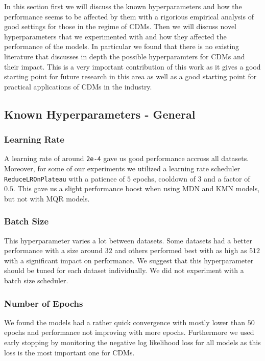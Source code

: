 In this section first we will discuss the known hyperparameters and how the performance seems to be affected by them with a rigorious empirical analysis of good settings for those in the regime of CDMs. Then we will discuss novel hyperparameters that we experimented with and how they affected the performance of the models. In particular we found that there is no existing literature that discusses in depth the possible hyperparamters for CDMs and their impact. This is a very important contribution of this work as it gives a good starting point for future research in this area as well as a good starting point for practical applications of CDMs in the industry.

\subsection{Known Hyperparameters - General}

\subsubsection{Learning Rate}

A learning rate of around \texttt{2e-4} gave us good performance accross all datasets. Moreover, for some of our experiments we utilized a learning rate scheduler \texttt{ReduceLROnPlateau} with a patience of $5$ epochs, cooldown of $3$ and a factor of $0.5$. This gave us a slight performance boost when using MDN and KMN models, but not with MQR models.

\subsubsection{Batch Size}

This hyperparameter varies a lot between datasets. Some datasets had a better performance with a size around $32$ and others performed best with as high as $512$ with a significant impact on performance. We suggest that this hyperparameter should be tuned for each dataset individually. We did not experiment with a batch size scheduler.

\subsubsection{Number of Epochs}

We found the models had a rather quick convergence with mostly lower than $50$ epochs and performance not improving with more epochs. Furthermore we used early stopping by monitoring the negative log likelihood loss for all models as this loss is the most important one for CDMs.

